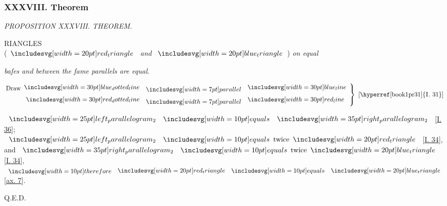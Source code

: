 \documentclass[11pt,preview]{standalone}
\begin{document}
\subsubsection{XXXVIII. Theorem}

\hfill

\begin{minipage}[t]{0.54\textwidth}
    \begin{center}
        \textit{PROPOSITION XXXVIII. THEOREM.}\label{book1pr38} \\
    \end{center}

    \hfill

    \begin{center}
        \raggedright \lettrine[lines=3, loversize=1, nindent=0pt]{}{}RIANGLES\\ (\hspace{-1ex}$\img[0][0][20]{red_triangle}$ \textit{and} $\img[0][0][20]{blue_triangle}$\hspace{-1ex}) \textit{on equal}
    \end{center}
    \textit{baſes and between the ſame parallels are equal}.
\end{minipage}%
\hfill
\begin{minipage}[t]{0.43\textwidth}
    \vspace{24pt}
    
\end{minipage}

\hfill

\hfill

\begin{center}
    $\left.\begin{aligned}\text{Draw}\dottedblueline & \bparallel \blueline \\ \dottedredline & \bparallel \redline \end{aligned}\right\}\text{ [\hyperref[book1pr31]{\textsc{I.} 31}]}$
\end{center}

\hfill

\hfill

\begin{center}
    $\img{left_parallelogram_2} \bequals \img[0][0][35]{right_parallelogram_2}$ [\hyperref[book1pr36]{\textsc{I.} 36}];\\
    $\img{left_parallelogram_2} \bequals \text{twice} \img[0][0][20]{red_triangle}$ [\hyperref[book1pr34]{\textsc{I.} 34}],\\
    and $\img[0][0][35]{right_parallelogram_2} \bequals \text{twice} \img[0][0][20]{blue_triangle}$ [\hyperref[book1pr34]{\textsc{I.} 34}],\\
    $\btherefore \img[0][0][20]{red_triangle} \bequals \img[0][0][20]{blue_triangle}$ [\hyperref[ax7]{ax. 7}].
\end{center}

\hfill

\hfill Q.E.D.
\end{document}
